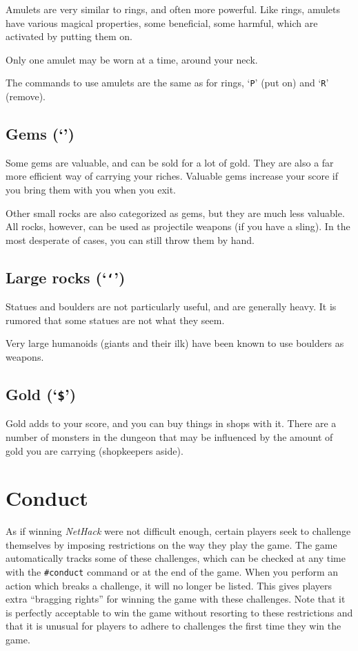 Amulets are very similar to rings, and often more powerful.  Like
rings, amulets have various magical properties, some beneficial,
some harmful, which are activated by putting them on.

Only one amulet may be worn at a time, around your neck.

The commands to use amulets are the same as for rings, `{\tt P}' (put on)
and `{\tt R}' (remove).

\subsection*{Gems (`{\tt *}')}

Some gems are valuable, and can be sold for a lot of gold.  They are also
a far more efficient way of carrying your riches.  Valuable gems increase
your score if you bring them with you when you exit.

Other small rocks are also categorized as gems, but they are much less
valuable.  All rocks, however, can be used as projectile weapons (if you
have a sling).  In the most desperate of cases, you can still throw them
by hand.

\subsection*{Large rocks (`{\tt `}')}
Statues and boulders are not particularly useful, and are generally
heavy.  It is rumored that some statues are not what they seem.

Very large humanoids (giants and their ilk) have been known to use boulders
as weapons.

\subsection*{Gold (`{\tt \$}')}

Gold adds to your score, and you can buy things in shops with it.
There are a number
of monsters in the dungeon that may be influenced by the amount of gold
you are carrying (shopkeepers aside).

\section{Conduct}

As if winning {\it NetHack\/} were not difficult enough, certain players
seek to challenge themselves by imposing restrictions on the
way they play the game.  The game automatically tracks some of
these challenges, which can be checked at any time with the {\tt \#conduct}
command or at the end of the game.  When you perform an action which
breaks a challenge, it will no longer be listed.  This gives
players extra ``bragging rights'' for winning the game with these
challenges.  Note that it is perfectly acceptable to win the game
without resorting to these restrictions and that it is unusual for
players to adhere to challenges the first time they win the game.

